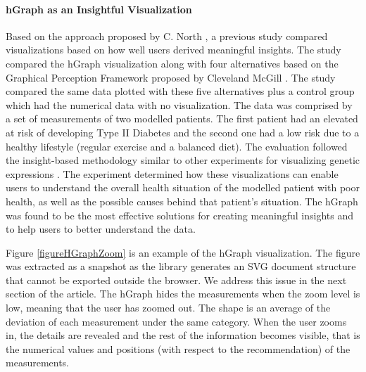 \documentclass[twocolumn]{bmcart}%
\begin{document}
\paragraph*{hGraph as an Insightful Visualization}
Based on the approach proposed by C. North \cite{north2006toward}, a previous study compared visualizations based on how well users derived meaningful insights. The study compared the hGraph visualization along with four alternatives based on the Graphical Perception Framework proposed by Cleveland McGill \cite{cleveland1984graphical}. The study compared the same data plotted with these five alternatives plus a control group which had the numerical data with no visualization. The data was comprised by a set of measurements of two modelled patients. The first patient had an elevated at risk of developing Type II Diabetes and the second one had a low risk due to a healthy lifestyle (regular exercise and a balanced diet). The evaluation followed the insight-based methodology similar to other experiments for visualizing genetic expressions \cite{saraiya2004evaluation}. The experiment determined how these visualizations can enable users to understand the overall health situation of the modelled patient with poor health, as well as the possible causes behind that patient's situation. The hGraph was found to be the most effective solutions for creating meaningful insights and to help users to better understand the data.




Figure \ref{figureHGraphZoom} is an example of the hGraph visualization. The figure was extracted as a snapshot as the library generates an SVG document structure that cannot be exported outside the browser. We address this issue in the next section of the article. The hGraph hides the measurements when the zoom level is low, meaning that the user has zoomed out. The shape is an average of the deviation of each measurement under the same category. When the user zooms in, the details are revealed and the rest of the information becomes visible, that is the numerical values and positions (with respect to the recommendation) of the measurements.
\end{document}
